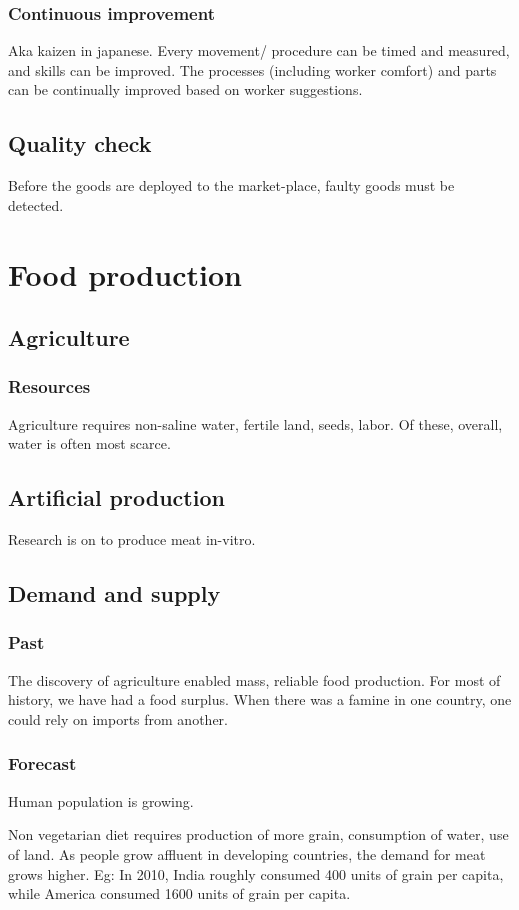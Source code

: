 \documentclass[oneside, article]{memoir}
\begin{document}
\subsection{Continuous improvement}
Aka kaizen in japanese. Every movement/ procedure can be timed and measured, and skills can be improved. The processes (including worker comfort) and parts can be continually improved based on worker suggestions.

\section{Quality check}
Before the goods are deployed to the market-place, faulty goods must be detected.

\chapter{Food production}
\section{Agriculture}
\subsection{Resources}
Agriculture requires non-saline water, fertile land, seeds, labor. Of these, overall, water is often most scarce.

\section{Artificial production}
Research is on to produce meat in-vitro.

\section{Demand and supply}
\subsection{Past}
The discovery of agriculture enabled mass, reliable food production. For most of history, we have had a food surplus. When there was a famine in one country, one could rely on imports from another.

\subsection{Forecast}
Human population is growing.

Non vegetarian diet requires production of more grain, consumption of water, use of land. As people grow affluent in developing countries, the demand for meat grows higher. Eg: In 2010, India roughly consumed 400 units of grain per capita, while America consumed 1600 units of grain per capita.
\end{document}
